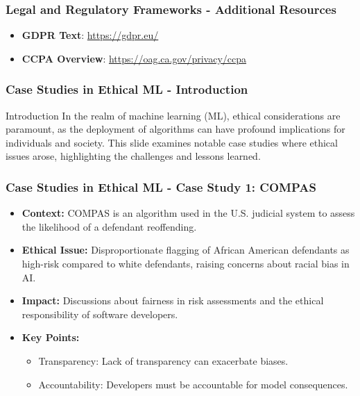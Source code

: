 \documentclass[aspectratio=169]{beamer}
\begin{document}
\begin{frame}[fragile]
    \frametitle{Legal and Regulatory Frameworks - Additional Resources}
    \begin{itemize}
        \item \textbf{GDPR Text}: \url{https://gdpr.eu/}
        \item \textbf{CCPA Overview}: \url{https://oag.ca.gov/privacy/ccpa}
    \end{itemize}
\end{frame}

\begin{frame}[fragile]
    \frametitle{Case Studies in Ethical ML - Introduction}
    \begin{block}{Introduction}
        In the realm of machine learning (ML), ethical considerations are paramount,
        as the deployment of algorithms can have profound implications for individuals 
        and society. This slide examines notable case studies where ethical issues arose,
        highlighting the challenges and lessons learned.
    \end{block}
\end{frame}

\begin{frame}[fragile]
    \frametitle{Case Studies in Ethical ML - Case Study 1: COMPAS}
    \begin{itemize}
        \item \textbf{Context:} COMPAS is an algorithm used in the U.S. judicial system 
        to assess the likelihood of a defendant reoffending.
        \item \textbf{Ethical Issue:} Disproportionate flagging of African American 
        defendants as high-risk compared to white defendants, raising concerns about 
        racial bias in AI.
        \item \textbf{Impact:} Discussions about fairness in risk assessments 
        and the ethical responsibility of software developers.
        \item \textbf{Key Points:}
        \begin{itemize}
            \item Transparency: Lack of transparency can exacerbate biases.
            \item Accountability: Developers must be accountable for model consequences.
        \end{itemize}
    \end{itemize}
\end{frame}
\end{document}
